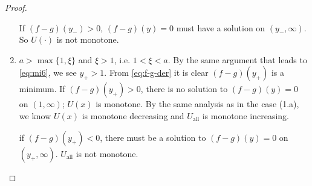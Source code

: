 \documentclass[11pt,a4]{amsart}
\newcommand{\1}{{\mathbf 1}}
\begin{document}
\begin{proof}
\begin{enumerate}
    If $(f-g)(y_-) > 0$, $(f-g)(y) = 0$ must have a solution on $(y_-,
    \infty)$. So $U(\cdot)$ is not monotone.

    \item $a > \max\{1, \xi\}$ and $\xi > 1$, i.e. $1 < \xi < a$. By
      the same argument that leads to \eqref{eq:mi6}, we see
      $y_+ > 1$. From \eqref{eq:f-g-der} it is clear $(f-g)(y_+)$ is a
      minimum. If $(f-g)(y_+) > 0$, there is no solution to
      $(f-g)(y) = 0$ on $(1, \infty)$; $U(x)$ is monotone. By the
      same analysis as in the case (1.a), we know $U(x)$ is
      monotone decreasing and $U_{\text{all}}$ is monotone increasing.
      
      if $(f-g)(y_+) < 0$, there must be a solution to $(f-g)(y) = 0$
      on $(y_+, \infty)$. $U_{\text{all}}$ is not monotone.
  \end{enumerate}
\end{proof}



\end{document}
